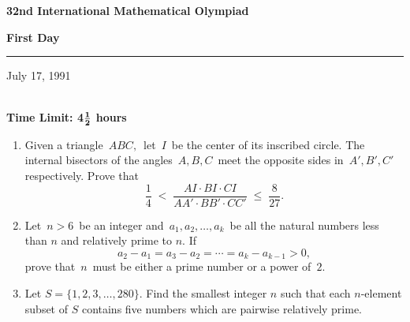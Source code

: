 \setlength{\baselineskip}{0.25in}
\setlength{\leftmargin}{0.0in}
\setlength{\textwidth}{6.5in}
\setlength{\topmargin}{0.0in}
\setlength{\textheight}{9in}
\setlength{\headheight}{0.0in}
\setlength{\headsep}{0.0in}
\setlength{\oddsidemargin}{0.0in}



\begin{center}
{\bf 32nd International Mathematical Olympiad}\\[.1in]
{\bf First Day \rule[.05in]{.25in}{.01in} July 17, 1991} \\
{\bf Time Limit: 4}${{\bf 1}\over{\bf 2}}$ {\bf
hours}
\end{center}
\begin{enumerate}
\item
Given a triangle $\, ABC, \,$ let $\, I \,$ be the center of its
inscribed
circle.  The internal bisectors of the angles $\, A,B,C \,$ meet
the
opposite sides in $\, A',B',C'\, $ respectively.  Prove that
\[
\frac{1}{4} \; < \; \frac{AI \cdot BI \cdot CI}{AA' \cdot BB'
\cdot
CC'} \; \leq  \; \frac{8}{27}.
\]
\item
Let $\, n > 6 \,$ be an integer and $\, a_1, a_2, \ldots, a_k \,$
be all the
natural numbers less than $n$ and relatively prime to $n$.
If
\[
a_2 - a_1 = a_3 - a_2 = \cdots = a_k - a_{k-1} > 0,
\]
prove that $\, n \,$ must be either a prime number or a power of
$\, 2$.
\item
Let $S = \{1,2,3,\ldots,280\}$.  Find the smallest integer $n$
such that each $n$-element subset of $S$ contains five numbers
which are pairwise relatively prime.
\end{enumerate}

